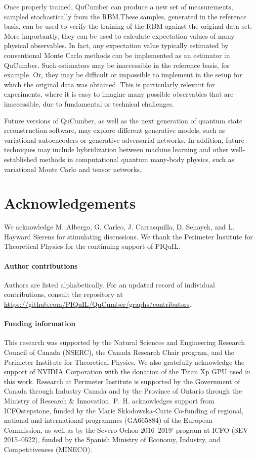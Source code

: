 \documentclass[submission, Phys, hidelnks]{SciPost}
\begin{document}
Once properly trained, QuCumber can produce a new set of measurements,
sampled stochastically from the RBM.\@ These samples, generated in the
reference basis, can be used to verify the training of the RBM against the
original data set. More importantly, they can be used to calculate expectation
values of many physical observables. In fact, any expectation value typically
estimated by conventional Monte Carlo methods can be implemented as an
estimator in QuCumber. Such estimators may be inaccessible in the reference
basis, for example. Or, they may be difficult or impossible to implement in the
setup for which the original data was obtained.  This is particularly relevant
for experiments, where it is easy to imagine many possible observables that are
inaccessible, due to fundamental or technical challenges.

Future versions of QuCumber, as well as the next generation of quantum state
reconstruction software, may explore different generative models, such as
variational autoencoders or generative adversarial networks.
In addition, future techniques may include hybridization between machine
learning and other well-established methods in computational quantum many-body
physics, such as variational Monte Carlo and tensor networks.

\section*{Acknowledgements}
We acknowledge M. Albergo, G. Carleo, J. Carrasquilla, D. Sehayek, and
L. Hayward Sierens for stimulating discussions.
We thank the Perimeter Institute for Theoretical Physics for the continuing support of PIQuIL.\@

\paragraph{Author contributions}
Authors are listed alphabetically. For an updated record of individual
contributions, consult the repository
at \url{https://github.com/PIQuIL/QuCumber/graphs/contributors}.

\paragraph{Funding information}

This research was supported by the Natural Sciences and Engineering
Research Council of Canada (NSERC), the
Canada Research Chair program, and the Perimeter Institute
for Theoretical Physics. We also gratefully
acknowledge the support of NVIDIA Corporation with
the donation of the Titan Xp GPU used in this work.
Research at Perimeter Institute is supported by the Government
of Canada through Industry Canada and by the
Province of Ontario through the Ministry of Research \&
Innovation. P.~H. acknowledges support from ICFOstepstone,
funded by the Marie Sklodowska-Curie Co-funding of regional,
national and international programmes (GA665884) of the European
Commission, as well as by the Severo Ochoa 2016{--}2019' program at
ICFO (SEV{--}2015{--}0522), funded by the Spanish Ministry of Economy,
 Industry, and Competitiveness (MINECO).
\end{document}
